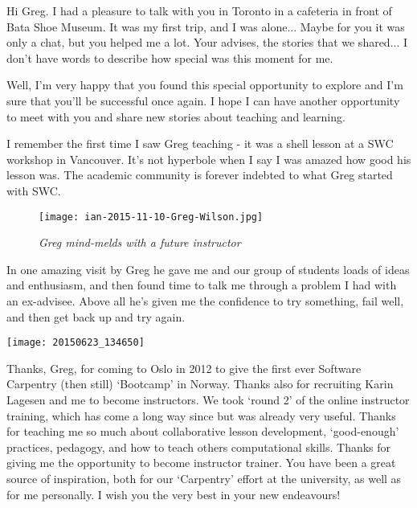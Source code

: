 Hi Greg. I had a pleasure to talk with you in Toronto in a cafeteria in front
of Bata Shoe Museum. It was my first trip, and I was alone... Maybe for you it
was only a chat, but you helped me a lot. Your advises, the stories that we
shared... I don't have words to describe how special was this moment for me. 

Well, I'm very happy that you found this special opportunity to explore and I'm
sure that you'll be successful once again. I hope I can have another
opportunity to meet with you and share new stories about teaching and learning.



I remember the first time I saw Greg teaching - it was a shell lesson at a SWC
workshop in Vancouver. It's not hyperbole when I say I was amazed how good his
lesson was. The academic community is forever indebted to what Greg started
with SWC. 


\newpage

\begin{figure}[h!]
\centering
\texttt{[image: ian-2015-11-10-Greg-Wilson.jpg]}
\caption*{\textit{Greg mind-melds with a future instructor}}
\end{figure}
\vspace{-0.25cm}

In one amazing visit by Greg he gave me and our group of students loads of
ideas and enthusiasm, and then found time to talk me through a problem I had
with an ex-advisee. Above all he's given me the confidence to try something,
fail well, and then get back up and try again.


\newpage

\begin{center}
\texttt{[image: 20150623\_134650]}
\end{center}

Thanks, Greg, for coming to Oslo in 2012 to give the first ever Software
Carpentry (then still) `Bootcamp' in Norway. Thanks also for recruiting Karin
Lagesen and me to become instructors. We took `round 2' of the online
instructor training, which has come a long way since but was already very
useful. Thanks for teaching me so much about collaborative lesson development,
`good-enough' practices, pedagogy, and how to teach others computational
skills. Thanks for giving me the opportunity to become instructor trainer. You
have been a great source of inspiration, both for our `Carpentry' effort at the
university, as well as for me personally. I wish you the very best in your new
endeavours!

